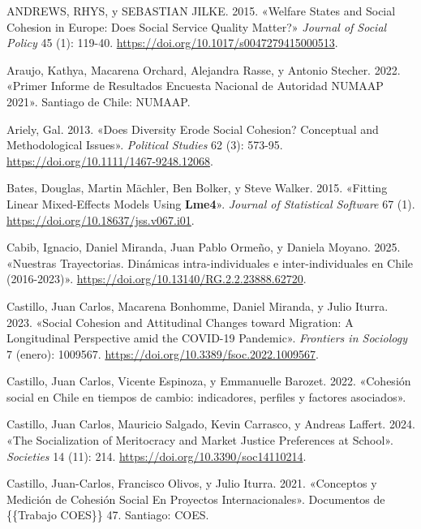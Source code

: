 \documentclass[
  spanish,
  letterpaper,
  DIV=11,
  numbers=noendperiod]{scrartcl}
\newlength{\cslhangindent}
\newenvironment{CSLReferences}[2] %
 {\begin{list}{}{%
  \setlength{\itemindent}{0pt}
  \setlength{\leftmargin}{0pt}
  \setlength{\parsep}{0pt}
  \ifodd #1
   \setlength{\leftmargin}{\cslhangindent}
   \setlength{\itemindent}{-1\cslhangindent}
  \fi
  \setlength{\itemsep}{#2\baselineskip}}}
 {\end{list}}
\begin{document}
\label{refs}
\begin{CSLReferences}{1}{0}
ANDREWS, RHYS, y SEBASTIAN JILKE. 2015. {«Welfare {States} and {Social
Cohesion} in {Europe}: {Does Social Service Quality Matter}?»}
\emph{Journal of Social Policy} 45 (1): 119-40.
\url{https://doi.org/10.1017/s0047279415000513}.

Araujo, Kathya, Macarena Orchard, Alejandra Rasse, y Antonio Stecher.
2022. {«Primer {Informe} de {Resultados Encuesta Nacional} de {Autoridad
NUMAAP} 2021»}. Santiago de Chile: NUMAAP.

Ariely, Gal. 2013. {«Does {Diversity Erode Social Cohesion}?
{Conceptual} and {Methodological Issues}»}. \emph{Political Studies} 62
(3): 573-95. \url{https://doi.org/10.1111/1467-9248.12068}.

Bates, Douglas, Martin Mächler, Ben Bolker, y Steve Walker. 2015.
{«Fitting {Linear Mixed-Effects Models Using} {\textbf{Lme4}}»}.
\emph{Journal of Statistical Software} 67 (1).
\url{https://doi.org/10.18637/jss.v067.i01}.

Cabib, Ignacio, Daniel Miranda, Juan Pablo Ormeño, y Daniela Moyano.
2025. {«{Nuestras Trayectorias. Din{á}micas intra-individuales e
inter-individuales en Chile (2016-2023)}»}.
\url{https://doi.org/10.13140/RG.2.2.23888.62720}.

Castillo, Juan Carlos, Macarena Bonhomme, Daniel Miranda, y Julio
Iturra. 2023. {«Social Cohesion and Attitudinal Changes toward
Migration: {A} Longitudinal Perspective amid the {COVID-19} Pandemic»}.
\emph{Frontiers in Sociology} 7 (enero): 1009567.
\url{https://doi.org/10.3389/fsoc.2022.1009567}.

Castillo, Juan Carlos, Vicente Espinoza, y Emmanuelle Barozet. 2022.
{«{Cohesi{ó}n social en Chile en tiempos de cambio: indicadores,
perfiles y factores asociados}»}.

Castillo, Juan Carlos, Mauricio Salgado, Kevin Carrasco, y Andreas
Laffert. 2024. {«The {Socialization} of {Meritocracy} and {Market
Justice Preferences} at {School}»}. \emph{Societies} 14 (11): 214.
\url{https://doi.org/10.3390/soc14110214}.

Castillo, Juan-Carlos, Francisco Olivos, y Julio Iturra. 2021.
{«Conceptos y Medici{ó}n de Cohesi{ó}n Social En Proyectos
Internacionales»}. Documentos de \{\{Trabajo COES\}\} 47. Santiago:
COES.


\end{CSLReferences}
\end{document}
